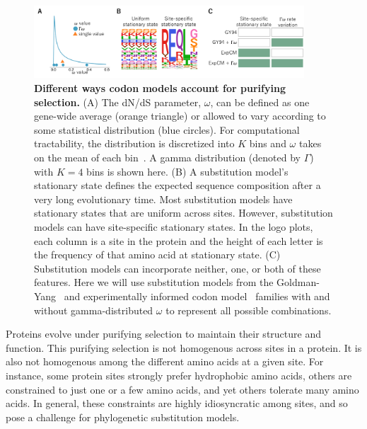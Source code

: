 \documentclass[11pt]{article}
\begin{document}
\begin{figure}
\centerline{\includegraphics[width=0.90\textwidth]{figures/model_feature.pdf}}
\caption{\label{fig:model_feature}
\textbf{Different ways codon models account for purifying selection.}
(A) The dN/dS parameter, $\omega$, can be defined as one gene-wide average (orange triangle) or allowed to vary according to some statistical distribution (blue circles). 
For computational tractability, the distribution is discretized into $K$ bins and $\omega$ takes on the mean of each bin~\citep{yang1994maximum,yang2000codon}. 
A gamma distribution (denoted by $\Gamma$) with $K=4$ bins is shown here.
(B) A substitution model's stationary state defines the expected sequence composition after a very long evolutionary time. 
Most substitution models have stationary states that are uniform across sites.
However, substitution models can have site-specific stationary states.
In the logo plots, each column is a site in the protein and the height of each letter is the frequency of that amino acid at stationary state. 
(C) Substitution models can incorporate neither, one, or both of these features.
Here we will use substitution models from the Goldman-Yang~\citep[GY94;][]{goldman1994codon,yang2000codon} and experimentally informed codon model~\citep[ExpCM;][]{hilton2017phydms} families with and without gamma-distributed $\omega$ to represent all possible combinations.
}
\end{figure}

Proteins evolve under purifying selection to maintain their structure and function. 
This purifying selection is not homogenous across sites in a protein.
It is also not homogenous among the different amino acids at a given site.
For instance, some protein sites strongly prefer hydrophobic amino acids, others are constrained to just one or a few amino acids, and yet others tolerate many amino acids.
In general, these constraints are highly idiosyncratic among sites, and so pose a challenge for phylogenetic substitution models.
\end{document}
